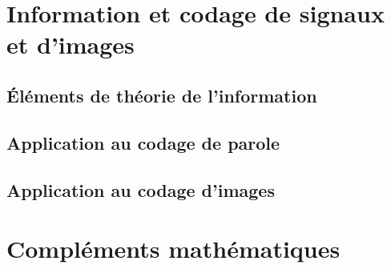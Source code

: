 \documentclass[graybox,envcountchap,envcountsame,sectrefs]{svmono}
\theoremstyle{exercise}
\begin{document}
\part{Information et codage de signaux et d'images}
\chapter{\'El\'ements de th\'eorie de l'information}
\label{info-chap}

\chapter{Application au codage de parole}

\chapter{Application au codage d'images}


\appendix
\part{Compl\'ements math\'ematiques}

\end{document}
